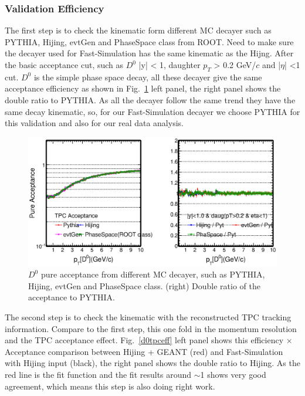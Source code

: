 \subsubsection{Validation Efficiency}
\label{validationeff}

The first step is to check the kinematic form different MC decayer such as PYTHIA, Hijing, evtGen and PhaseSpace class from ROOT. Need to make sure the decayer used for Fast-Simulation has the same kinematic as the Hijng. After the basic acceptance cut, such as $D^0$ |y| < 1, daughter $p_T$ > 0.2 GeV/$c$ and |$\eta$| <1 cut. $D^0$ is the simple phase space decay, all these decayer give the same acceptance efficiency as shown in Fig.~\ref{d0decayer} left panel, the right panel shows the double ratio to PYTHIA. As all the decayer follow the same trend they have the same decay kinematic, so, for our Fast-Simulation decayer we choose PYTHIA for this validation and also for our real data analysis.

\begin{figure}[htbp]
\centering
\includegraphics[keepaspectratio,width=1.0\textwidth]{figure/Run14_D0HFT/Acceptance_D0Decayer.eps}
\caption{$D^0$ pure acceptance from different MC decayer, such as PYTHIA, Hijing, evtGen and PhaseSpace class. (right) Double ratio of the acceptance to PYTHIA.}
\label{d0decayer}
\end{figure}

The second step is to check the kinematic with the reconstructed TPC tracking information. Compare to the first step, this one fold in the momentum resolution and the TPC acceptance effect. Fig.~\ref{d0tpceff} left panel shows this efficiency $\times$ Acceptance comparison between Hijing + GEANT (red) and Fast-Simulation with Hijing input (black), the right panel shows the double ratio to Hijing. As the red line is the fit function and the fit results around $\sim$1 shows very good agreement, which means this step is also doing right work.

